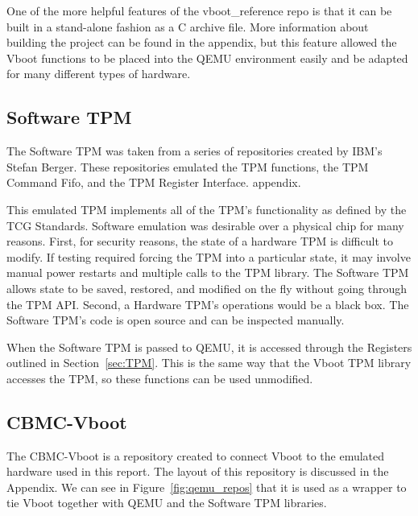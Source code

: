 One of the more helpful features of the vboot\_reference repo is that it can be
built in a stand-alone fashion as a C archive file.
More information about building the project can be found in the appendix, but
this feature allowed the Vboot functions to be placed into the QEMU environment
easily and be adapted for many different types of hardware.

\subsection{Software TPM}

The Software TPM was taken from a series of repositories created by IBM's
Stefan Berger. 
These repositories emulated the TPM functions\cite{TPMLibs}, the TPM Command
Fifo\cite{SWTPM}, and the TPM Register Interface\cite{TPMQEMU}. 
appendix.

This emulated TPM implements all of the TPM's functionality as defined by the
TCG Standards.
Software emulation was desirable over a physical chip for many reasons.
First, for security reasons, the state of a hardware TPM is difficult to modify.
If testing required forcing the TPM into a particular state, it may involve
manual power restarts and multiple calls to the TPM library.
The Software TPM allows state to be saved, restored, and modified on the fly
without going through the TPM API.
Second, a Hardware TPM's operations would be a black box.
The Software TPM's code is open source and can be inspected manually.

When the Software TPM is passed to QEMU, it is accessed through the 
Registers outlined in Section~\ref{sec:TPM}.
This is the same way that the Vboot TPM library accesses the TPM, so these
functions can be used unmodified. 

\subsection{CBMC-Vboot}

The CBMC-Vboot is a repository created to connect Vboot to the emulated
hardware used in this report\cite{my-repo}.
The layout of this repository is discussed in the Appendix.
We can see in Figure~\ref{fig:qemu_repos} that it is used as a wrapper to tie
Vboot together with QEMU and the Software TPM libraries.
